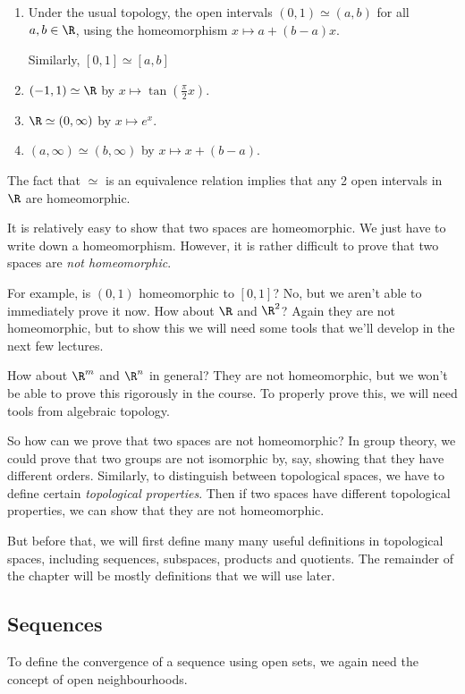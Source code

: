 \documentclass[a4paper]{article}
\begin{document}
\begin{eg}\leavevmode
  \begin{enumerate}
    \item Under the usual topology, the open intervals $(0, 1)\simeq (a, b)$ for all $a, b\in \R$, using the homeomorphism $x\mapsto a + (b - a)x$.

      Similarly, $[0, 1] \simeq [a, b]$
    \item $(-1, 1) \simeq \R$ by $x\mapsto \tan(\frac{\pi}{2}x)$.
    \item $\R\simeq (0, \infty)$ by $x\mapsto e^x$.
    \item $(a, \infty)\simeq (b, \infty)$ by $x\mapsto x + (b - a)$.
  \end{enumerate}
  The fact that $\simeq$ is an equivalence relation implies that any 2 open intervals in $\R$ are homeomorphic.

\end{eg}
It is relatively easy to show that two spaces are homeomorphic. We just have to write down a homeomorphism. However, it is rather difficult to prove that two spaces are \emph{not homeomorphic}.

For example, is $(0, 1)$ homeomorphic to $[0, 1]$? No, but we aren't able to immediately prove it now. How about $\R$ and $\R^2$? Again they are not homeomorphic, but to show this we will need some tools that we'll develop in the next few lectures.

How about $\R^m$ and $\R^n$ in general? They are not homeomorphic, but we won't be able to prove this rigorously in the course. To properly prove this, we will need tools from algebraic topology.

So how can we prove that two spaces are not homeomorphic? In group theory, we could prove that two groups are not isomorphic by, say, showing that they have different orders. Similarly, to distinguish between topological spaces, we have to define certain \emph{topological properties}. Then if two spaces have different topological properties, we can show that they are not homeomorphic.

But before that, we will first define many many useful definitions in topological spaces, including sequences, subspaces, products and quotients. The remainder of the chapter will be mostly definitions that we will use later.
\subsection{Sequences}
To define the convergence of a sequence using open sets, we again need the concept of open neighbourhoods.
\end{document}
